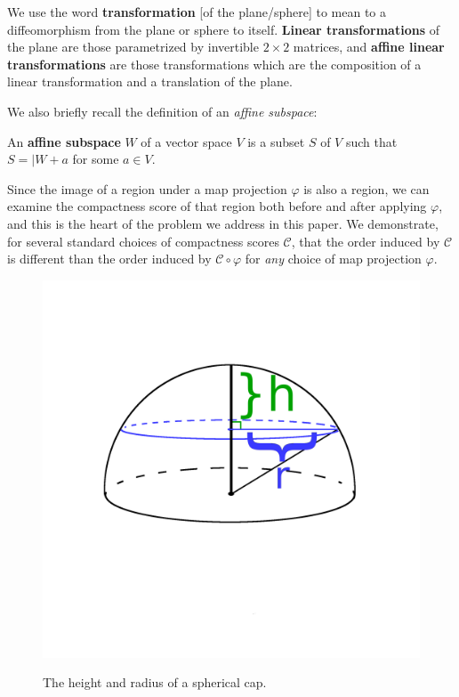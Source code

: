 \begin{definition}
We use the word \textbf{transformation} [of the plane/sphere] to mean
to a diffeomorphism from the plane or sphere to itself.
\textbf{Linear transformations} of the plane are those parametrized by
invertible $2{\times}2$ matrices, and \textbf{affine linear
transformations} are those transformations which are the composition
of a linear transformation and a translation of the plane.
\end{definition}
We also briefly recall the definition of an \textit{affine subspace}:
\begin{definition}
	An \textbf{affine subspace} $W$ of a vector space $V$ 
   is a subset $S$ of $V$ such 
  that $S = \vert W + a$ for some $a\in V$.
\end{definition}

Since the image of a region under a map projection $\varphi$ is also
a region, we can examine the compactness score of that region both 
before and after applying $\varphi$, and this is the heart of the
problem we address in this paper.  We demonstrate, for several
standard choices of compactness scores $\mathcal{C}$, that the order
induced by $\mathcal{C}$ is different than the order induced by
$\mathcal{C}\circ\varphi$ for \textit{any} choice of map projection
$\varphi$.


\begin{figure}
	\centering
	\includegraphics[width=.8\textwidth]{figs/spherecapschema}\\[1.5em]
	\caption{ The height and radius of a spherical cap. }
	\label{fig:caphr}
\end{figure}